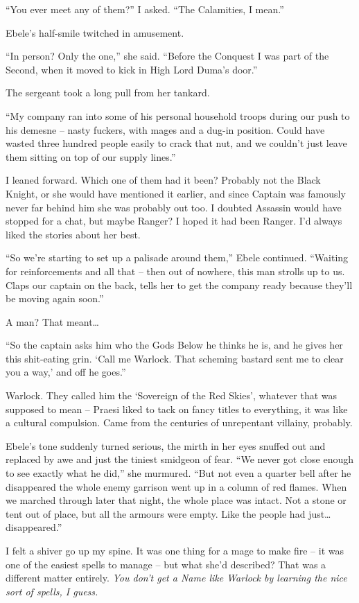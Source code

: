 \documentclass[12pt, openany]{book}
\begin{document}
“You ever meet any of them?” I asked. “The Calamities, I mean.”

Ebele’s half-smile twitched in amusement.

“In person? Only the one,” she said. “Before the Conquest I was part of the Second, when it moved to kick in High Lord Duma’s door.”

The sergeant took a long pull from her tankard.

“My company ran into some of his personal household troops during our push to his demesne – nasty fuckers, with mages and a dug-in position. Could have wasted three hundred people easily to crack that nut, and we couldn’t just leave them sitting on top of our supply lines.”

I leaned forward. Which one of them had it been? Probably not the Black Knight, or she would have mentioned it earlier, and since Captain was famously never far behind him she was probably out too. I doubted Assassin would have stopped for a chat, but maybe Ranger? I hoped it had been Ranger. I’d always liked the stories about her best.

“So we’re starting to set up a palisade around them,” Ebele continued. “Waiting for reinforcements and all that – then out of nowhere, this man strolls up to us. Claps our captain on the back, tells her to get the company ready because they’ll be moving again soon.”

A man? That meant…

“So the captain asks him who the Gods Below he thinks he is, and he gives her this shit-eating grin. ‘Call me Warlock. That scheming bastard sent me to clear you a way,’ and off he goes.”

Warlock. They called him the ‘Sovereign of the Red Skies’, whatever that was supposed to mean – Praesi liked to tack on fancy titles to everything, it was like a cultural compulsion. Came from the centuries of unrepentant villainy, probably.

Ebele’s tone suddenly turned serious, the mirth in her eyes snuffed out and replaced by awe and just the tiniest smidgeon of fear. “We never got close enough to see exactly what he did,” she murmured. “But not even a quarter bell after he disappeared the whole enemy garrison went up in a column of red flames. When we marched through later that night, the whole place was intact. Not a stone or tent out of place, but all the armours were empty. Like the people had just… disappeared.”

I felt a shiver go up my spine. It was one thing for a mage to make fire – it was one of the easiest spells to manage – but what she’d described? That was a different matter entirely. \textit{You don’t get a Name like Warlock by learning the nice sort of spells, I guess.}
\end{document}
